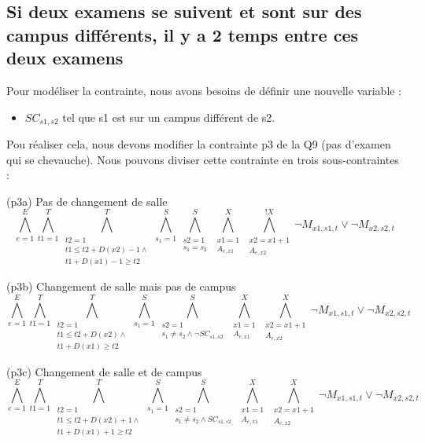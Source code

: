 \documentclass[a4paper,11pt]{article}
\begin{document}
\subsection{Si deux examens se suivent et sont sur des campus différents, il y a 2 temps entre ces deux examens}
Pour modéliser la contrainte, nous avons besoins de définir une nouvelle variable :  
\begin{itemize}
	\item \( SC_{s1,s2}\) tel que s1 est sur un campus différent de s2.
\end{itemize}
Pou réaliser cela, nous devons modifier la contrainte p3 de la Q9 (pas d'examen qui se chevauche). Nous pouvons diviser cette contrainte en trois sous-contraintes : 

(p3a) Pas de changement de salle
\begin{displaymath}
\bigwedge\limits_{e=1}^{E}\bigwedge\limits_{t1=1}^{T}\bigwedge\limits_{\substack{t2=1 \\ t1 \leq t2 + D(x2)-1 \wedge \\ t1 + D(x1)-1 \geq t2}}^{T}\bigwedge\limits_{s_{1}=1}^{S}\bigwedge\limits_{\substack{s2=1 \\ s_{1} = s_{2}}}^{S}\bigwedge\limits_{\substack{x1=1 \\ A_{e,x1}}}^{X}\bigwedge\limits_{\substack{x2=x1+1 \\ A_{e,x2}}}^{!X} \neg M_{x1, s1, t} \vee \neg M_{x2, s2, t}
\end{displaymath}

(p3b) Changement de salle mais pas de campus
\begin{displaymath}
\bigwedge\limits_{e=1}^{E}\bigwedge\limits_{t1=1}^{T}\bigwedge\limits_{\substack{t2=1 \\ t1 \leq t2 + D(x2) \wedge \\ t1 + D(x1) \geq t2}}^{T}\bigwedge\limits_{s_{1}=1}^{S}\bigwedge\limits_{\substack{s2=1 \\ s_{1} \neq s_{2} \wedge \neg SC_{s1,s2} }}^{S}\bigwedge\limits_{\substack{x1=1 \\ A_{e,x1}}}^{X}\bigwedge\limits_{\substack{x2=x1+1 \\ A_{e,x2}}}^{X} \neg M_{x1, s1, t} \vee \neg M_{x2, s2, t}
\end{displaymath}

(p3c) Changement de salle et de campus
\begin{displaymath}
\bigwedge\limits_{e=1}^{E}\bigwedge\limits_{t1=1}^{T}\bigwedge\limits_{\substack{t2=1 \\ t1 \leq t2 + D(x2) +1 \wedge \\ t1 + D(x1) +1 \geq t2}}^{T}\bigwedge\limits_{s_{1}=1}^{S}\bigwedge\limits_{\substack{s2=1 \\ s_{1} \neq s_{2} \wedge SC_{s1,s2}}}^{S}\bigwedge\limits_{\substack{x1=1 \\ A_{e,x1}}}^{X}\bigwedge\limits_{\substack{x2=x1+1 \\ A_{e,x2}}}^{X} \neg M_{x1, s1, t} \vee \neg M_{x2, s2, t}
\end{displaymath}
\end{document}
